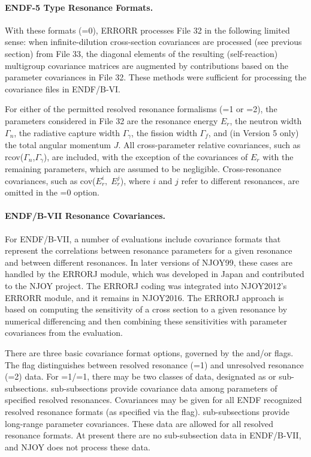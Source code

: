 \paragraph{ENDF-5 Type Resonance Formats.}  With these formats
(=0), ERRORR processes File 32 in the following
limited sense: when infinite-dilution cross-section covariances
are processed (see previous section) from File 33, the  diagonal
elements of the resulting (self-reaction) multigroup covariance
matrices are augmented by contributions based on the parameter
covariances in File 32.  These methods were sufficient for
processing the covariance files in ENDF/B-VI.

For either of the permitted resolved resonance formalisms
(=1 or =2), the parameters considered in File 32 are
the resonance energy $E_r$, the neutron width $\Gamma_n$, the radiative
capture width $\Gamma_{\gamma}$, the fission width $\Gamma_f$, and (in
Version 5 only) the total angular momentum $J$.  All cross-parameter
relative covariances, such as r{\rm cov}($\Gamma_n$,$\Gamma_{\gamma}$),
are included, with the exception of the covariances of $E_r$ with the
remaining parameters, which are assumed to be negligible.
Cross-resonance covariances, such as {\rm cov}($E_r^i,\;E_r^j$), where
$i$ and $j$ refer to different resonances, are omitted in the
=0 option.

\paragraph{ENDF/B-VII Resonance Covariances.} For ENDF/B-VII, a
number of evaluations include covariance formats that represent
the correlations between resonance parameters for a given
resonance and between different resonances.  In later versions
of NJOY99, these cases are handled by the ERRORJ\cite{ERRORJ}
module, which was developed in Japan and contributed to the
NJOY project.  The ERRORJ coding was integrated into NJOY2012's
ERRORR module, and it remains in NJOY2016.  The ERRORJ approach
is based on computing the sensitivity of a cross section to a
given resonance by numerical differencing and then combining
these sensitivities with parameter covariances from the evaluation.

There are three basic covariance format options, governed by the
 and/or  flags.  The  flag
distinguishes between resolved resonance (=1) and
unresolved resonance (=2) data.  For =1/=1,
there may be two classes of data, designated as  or
 sub-subsections.   sub-subsections provide covariance
data among parameters of specified resolved resonances.  Covariances
may be given for all ENDF recognized resolved resonance formats (as
specified via the  flag).   sub-subsections provide
long-range parameter covariances.    These data are allowed for
all resolved resonance formats.  At present there are no 
sub-subsection data in ENDF/B-VII, and NJOY does not process
these data.

